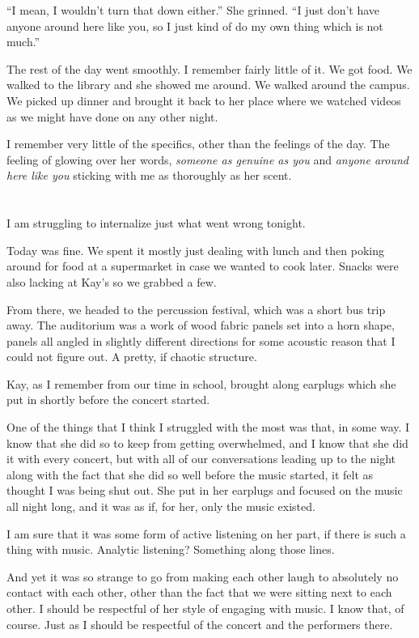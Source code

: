``I mean, I wouldn't turn that down either.'' She grinned. ``I just don't have anyone around here like you, so I just kind of do my own thing which is not much.''

The rest of the day went smoothly. I remember fairly little of it. We got food. We walked to the library and she showed me around. We walked around the campus. We picked up dinner and brought it back to her place where we watched videos as we might have done on any other night.

I remember very little of the specifics, other than the feelings of the day. The feeling of glowing over her words, \emph{someone as genuine as you} and \emph{anyone around here like you} sticking with me as thoroughly as her scent.

\section{}

I am struggling to internalize just what went wrong tonight.

Today was fine. We spent it mostly just dealing with lunch and then poking around for food at a supermarket in case we wanted to cook later. Snacks were also lacking at Kay's so we grabbed a few.

From there, we headed to the percussion festival, which was a short bus trip away. The auditorium was a work of wood fabric panels set into a horn shape, panels all angled in slightly different directions for some acoustic reason that I could not figure out. A pretty, if chaotic structure.

Kay, as I remember from our time in school, brought along earplugs which she put in shortly before the concert started.

One of the things that I think I struggled with the most was that, in some way. I know that she did so to keep from getting overwhelmed, and I know that she did it with every concert, but with all of our conversations leading up to the night along with the fact that she did so well before the music started, it felt as thought I was being shut out. She put in her earplugs and focused on the music all night long, and it was as if, for her, only the music existed.

I am sure that it was some form of active listening on her part, if there is such a thing with music. Analytic listening? Something along those lines.

And yet it was so strange to go from making each other laugh to absolutely no contact with each other, other than the fact that we were sitting next to each other. I should be respectful of her style of engaging with music. I know that, of course. Just as I should be respectful of the concert and the performers there.

